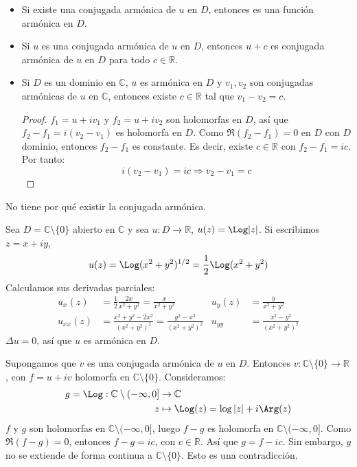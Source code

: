 \begin{properties}
    \hfill
    \begin{itemize}
        \item Si existe una conjugada armónica de $u$ en $D$, entonces es una función armónica en $D$.
        \item Si $u$ es una conjugada armónica de $u$ en $D$, entonces $u + c$ es conjugada armónica de $u$ en $D$ para todo $c \in \mathbb{R}$.
        \item Si $D$ es un dominio en $\mathbb{C}$, $u$ es armónica en $D$ y $v_1, v_2$ son conjugadas armónicas de $u$ en $\mathbb{C}$, entonces existe $c \in \mathbb{R}$ tal que $v_1-v_2 = c$.
              \begin{proof}
                  $f_1 = u + iv_1$ y $f_2 = u + iv_2$ son holomorfas en $D$, así que $f_2 - f_1 = i(v_2-v_1)$ es holomorfa en $D$.
                  Como $\Re(f_2-f_1) = 0$ en $D$ con $D$ dominio, entonces $f_2 - f_1$ es constante.
                  Es decir, existe $c \in \mathbb{R}$ con $f_2-f_1 = ic$.
                  Por tanto:
                  $$i(v_2-v_1) = ic \Rightarrow v_2 - v_1 = c$$
              \end{proof}
    \end{itemize}
\end{properties}

No tiene por qué existir la conjugada armónica.

\begin{example}[Contraejemplo]
    Sea $D = \mathbb{C} \setminus \{0\}$ abierto en $\mathbb{C}$ y sea $u: D \to \mathbb{R}$, $u(z) = \Log|z|$.
    Si escribimos $z = x +iy$,
    $$u(z) = \Log(x^2 + y^2)^{1/2} = \frac{1}{2}\Log(x^2+y^2)$$
    Calculamos sus derivadas parciales:
    \begin{align*}
        u_x(z)    & = \frac{1}{2} \frac{2x}{x^2+y^2} = \frac{x}{x^2+y^2}             & u_y(z) & = \frac{y}{x^2+y^2}           \\
        u_{xx}(z) & = \frac{x^2+y^2-2x^2}{(x^2+y^2)^2} = \frac{y^2-x^2}{(x^2+y^2)^2} & u_{yy} & = \frac{x^2-y^2}{(x^2+y^2)^2}
    \end{align*}
    $\Delta u = 0$, así que $u$ es armónica en $D$.

    Supongamos que $v$ es una conjugada armónica de $u$ en $D$.
    Entonces $v: \mathbb{C} \setminus \{0\} \to \mathbb{R}$, con $f = u + iv$ holomorfa en $\mathbb{C} \setminus \{0\}$.
    Consideramos:
    \begin{align*}
        g = \Log: \mathbb{C} \setminus (-\infty, 0] & \to \mathbb{C}                       \\
        z                                           & \mapsto \Log(z) = \log|z| + i\Arg(z)
    \end{align*}
    $f$ y $g$ son holomorfas en $\mathbb{C} \setminus (-\infty, 0]$, luego $f-g$ es holomorfa en $\mathbb{C} \setminus (-\infty, 0]$.
    Como $\Re(f-g) = 0$, entonces $f-g = ic$, con $c \in \mathbb{R}$.
    Así que $g = f - ic$.
    Sin embargo, $g$ no se extiende de forma continua a $\mathbb{C} \setminus \{0\}$.
    Esto es una contradicción.
\end{example}

